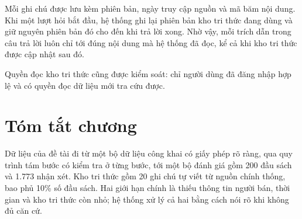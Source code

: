 Mỗi ghi chú được lưu kèm phiên bản, ngày truy cập nguồn và mã băm nội dung. Khi một lượt hỏi bắt đầu, hệ thống ghi lại phiên bản kho tri thức đang dùng và giữ nguyên phiên bản đó cho đến khi trả lời xong. Nhờ vậy, mỗi trích dẫn trong câu trả lời luôn chỉ tới đúng nội dung mà hệ thống đã đọc, kể cả khi kho tri thức được cập nhật sau đó.

Quyền đọc kho tri thức cũng được kiểm soát: chỉ người dùng đã đăng nhập hợp lệ và có quyền đọc dữ liệu mới tra cứu được.

\section{Tóm tắt chương}

Dữ liệu của đề tài đi từ một bộ dữ liệu công khai có giấy phép rõ ràng, qua quy trình tám bước có kiểm tra ở từng bước, tới một bộ đánh giá gồm 200 đầu sách và 1.773 nhận xét. Kho tri thức gồm 20 ghi chú tự viết từ nguồn chính thống, bao phủ 10\% số đầu sách. Hai giới hạn chính là thiếu thông tin người bán, thời gian và kho tri thức còn nhỏ; hệ thống xử lý cả hai bằng cách nói rõ khi không đủ căn cứ.
